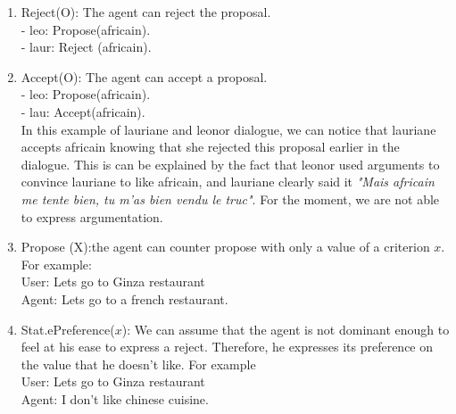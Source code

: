\documentclass{llncs}
\begin{document}
\begin{enumerate}
\item Reject(O): The agent can reject the proposal.
\\ - leo: Propose(africain).
\\ - laur: Reject (africain). 
\item Accept(O): The agent can accept a proposal.
\\ - leo: Propose(africain).
\\ - lau: Accept(africain). 
\\ In this example of lauriane and leonor dialogue, we can notice that lauriane accepts africain  knowing that she rejected this proposal earlier in the dialogue. This is can be explained by the fact that leonor used arguments to convince lauriane to like africain, and lauriane clearly said it \textit{"Mais africain  me tente bien, tu m'as bien vendu le truc"}. For the moment, we are not able to express argumentation. 

\item Propose (X):the agent can counter propose with only a value of a criterion $x$. 
For example:
\\ User: Lets go to Ginza restaurant
\\ Agent: Lets go to a french restaurant. 

\item Stat.ePreference($x$): We can assume that the agent is not dominant enough to feel at his  ease to express a reject. Therefore, he expresses its preference on the value that he doesn't like. For example
\\ User: Lets go to Ginza restaurant
\\ Agent: I don't like chinese cuisine.  
\end{enumerate}
\end{document}
